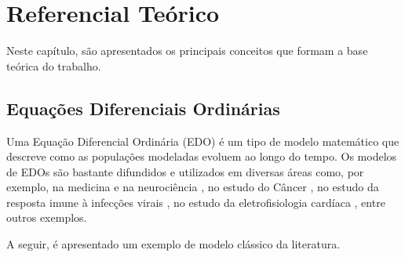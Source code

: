 \documentclass[
	12pt,				%
	openright,			%
	oneside,			%
	a4paper,			%
	main=brazil,
	english,			%
	]{ufsj-abntex2}
\begin{document}

\chapter{Referencial Teórico}
\label{chap:referencial}

Neste capítulo, são apresentados os principais conceitos que formam a base teórica do trabalho. 

\section{Equações Diferenciais Ordinárias}

Uma Equação Diferencial Ordinária (EDO) é um tipo de modelo matemático que descreve como as populações modeladas evoluem ao longo do tempo. Os modelos de EDOs são bastante difundidos e utilizados em diversas áreas como, por exemplo, na medicina e na neurociência \cite{ADOMIAN1995107}, no estudo do Câncer \cite{spencer2004ordinary, talkington2018ordinary}, no estudo da resposta imune à infecções virais \cite{reis2021validated}, no estudo da eletrofisiologia cardíaca \cite{VIGMOND20083, bucelli2022mathematical}, entre outros exemplos. 

A seguir, é apresentado um exemplo de modelo clássico da literatura. 

\end{document}
